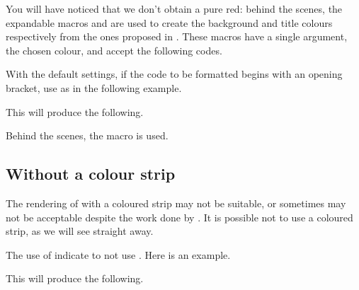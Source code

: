 \begin{tdocnote}
    You will have noticed that we don't obtain a pure red: behind the scenes, the expandable macros  and  are used to create the background and title colours respectively from the ones proposed in .
    These macros have a single argument, the chosen colour, and accept the following codes.

    \begin{tdoclatex}[code]
    \end{tdoclatex}
\end{tdocnote}




\begin{tdocwarn}
    With the default settings, if the code to be formatted begins with an opening bracket, use  as in the following example.



    This will produce the following.

    \medskip

    

\end{tdocwarn}


\begin{tdocnote}
    Behind the scenes, the  macro is used.

    \begin{tdoclatex}[std]
    \end{tdoclatex}
\end{tdocnote}


\subsection{Without a colour strip}

The rendering of  with a coloured strip may not be suitable, or sometimes may not be acceptable despite the work done by .
It is possible not to use a coloured strip, as we will see straight away.


\begin{tdocexa}
    The use of  indicate to not use .
    Here is an example.



    This will produce the following.

    \medskip

    

\end{tdocexa}


